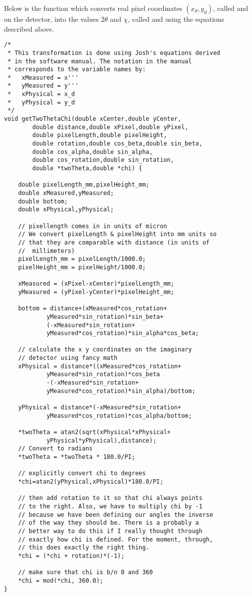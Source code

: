 Below is the function
 which converts real pixel
coordinates $(x_d,y_d)$, called 
and  on the detector, into the values 
$2\theta$ and $\chi$, called  and 
 using the equations described above. 
\begin{lstlisting}
/*
 * This transformation is done using Josh's equations derived
 * in the software manual. The notation in the manual 
 * corresponds to the variable names by:
 *   xMeasured = x'''
 *   yMeasured = y'''
 *   xPhysical = x_d
 *   yPhysical = y_d
 */
void getTwoThetaChi(double xCenter,double yCenter,
        double distance,double xPixel,double yPixel,
        double pixelLength,double pixelHeight,
        double rotation,double cos_beta,double sin_beta,
        double cos_alpha,double sin_alpha,
        double cos_rotation,double sin_rotation,
        double *twoTheta,double *chi) {

    double pixelLength_mm,pixelHeight_mm;
    double xMeasured,yMeasured;
    double bottom;
    double xPhysical,yPhysical;

    // pixellength comes in in units of micron
    // We convert pixelLength & pixelHeight into mm units so 
    // that they are comparable with distance (in units of 
    //  millimeters)
    pixelLength_mm = pixelLength/1000.0;
    pixelHeight_mm = pixelHeight/1000.0;
    
    xMeasured = (xPixel-xCenter)*pixelLength_mm;
    yMeasured = (yPixel-yCenter)*pixelHeight_mm;

    bottom = distance+(xMeasured*cos_rotation+ 
            yMeasured*sin_rotation)*sin_beta+
            (-xMeasured*sin_rotation+
            yMeasured*cos_rotation)*sin_alpha*cos_beta;
    
    // calculate the x y coordinates on the imaginary 
    // detector using fancy math
    xPhysical = distance*((xMeasured*cos_rotation+
            yMeasured*sin_rotation)*cos_beta
            -(-xMeasured*sin_rotation+
            yMeasured*cos_rotation)*sin_alpha)/bottom;

    yPhysical = distance*(-xMeasured*sin_rotation+
            yMeasured*cos_rotation)*cos_alpha/bottom;

    *twoTheta = atan2(sqrt(xPhysical*xPhysical+
            yPhysical*yPhysical),distance);
    // Convert to radians
    *twoTheta = *twoTheta * 180.0/PI;

    // explicitly convert chi to degrees
    *chi=atan2(yPhysical,xPhysical)*180.0/PI;
    
    // then add rotation to it so that chi always points 
    // to the right. Also, we have to multiply chi by -1 
    // because we have been defining our angles the inverse 
    // of the way they should be. There is a probably a 
    // better way to do this if I really thought through 
    // exactly how chi is defined. For the moment, through, 
    // this does exactly the right thing.
    *chi = (*chi + rotation)*(-1);

    // make sure that chi is b/n 0 and 360
    *chi = mod(*chi, 360.0);
}
\end{lstlisting}
